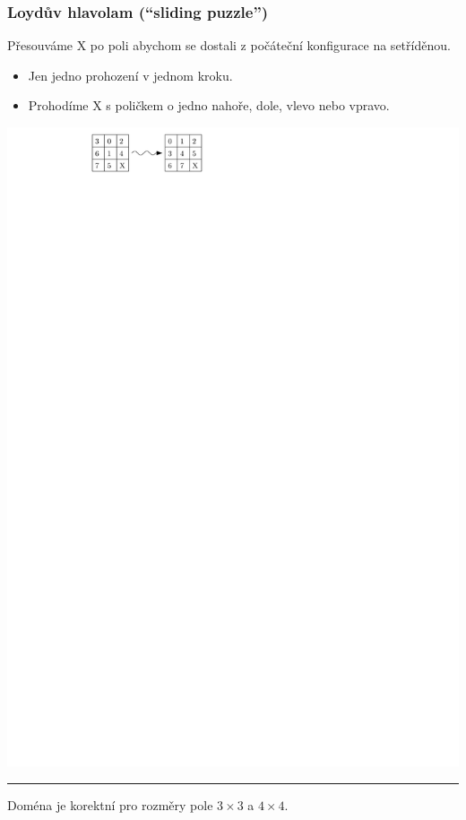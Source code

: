 \documentclass[usenames,dvipsnames,9pt]{beamer}
\begin{document}
\begin{frame}
  \frametitle{Loydův hlavolam (``sliding puzzle'')}
  
  Přesouváme X po poli abychom se dostali z počáteční konfigurace na setříděnou.
  
  \begin{itemize}
  \item Jen jedno prohození v jednom kroku.
  \item Prohodíme X s poličkem o jedno nahoře, dole, vlevo nebo vpravo.
  \end{itemize}
  
  \vspace{1em}

\begin{center}
\includegraphics[width=0.5\linewidth]{figs/sp.pdf}
\end{center}

\vspace{1em}\hrule\vspace{1em}

\faWarning\hspace{3pt} Doména je korektní pro rozměry pole $3\times 3$ a $4\times 4$.

\end{frame}
\end{document}
